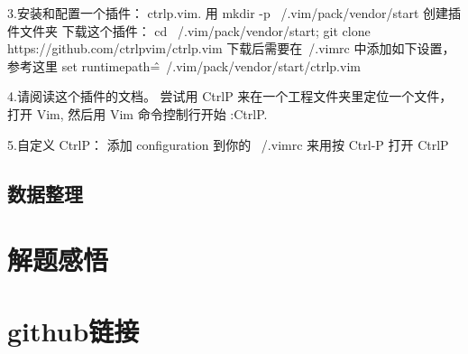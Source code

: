 \documentclass[a4paper ,12pt]{article}
\begin{document}
	 
	 3.安装和配置一个插件： ctrlp.vim.
	 用 mkdir -p ~/.vim/pack/vendor/start 创建插件文件夹
	 下载这个插件： cd ~/.vim/pack/vendor/start; git clone https://github.com/ctrlpvim/ctrlp.vim
	 下载后需要在~/.vimrc 中添加如下设置，参考这里
	 set runtimepath\^=~/.vim/pack/vendor/start/ctrlp.vim
	 
	 4.请阅读这个插件的文档。 尝试用 CtrlP 来在一个工程文件夹里定位一个文件， 打开 Vim, 然后用 Vim 命令控制行开始 :CtrlP.
	 
	 5.自定义 CtrlP： 添加 configuration 到你的 ~/.vimrc 来用按 Ctrl-P 打开 CtrlP
	 
	 
	 \subsection{数据整理}
	 	
	 \section{解题感悟} 
	 
	 \section{github链接}
	 
	 
\end{document}
